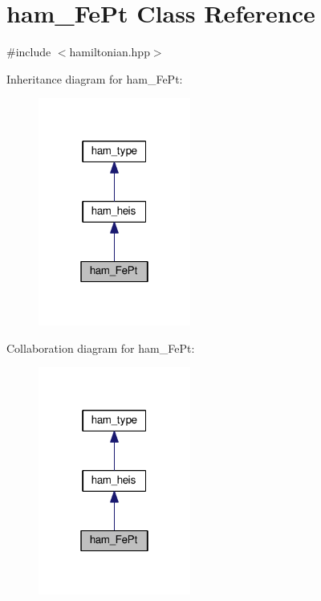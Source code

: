 \hypertarget{classham__FePt}{}\section{ham\+\_\+\+Fe\+Pt Class Reference}
\label{classham__FePt}


{\ttfamily \#include $<$hamiltonian.\+hpp$>$}



Inheritance diagram for ham\+\_\+\+Fe\+Pt\+:
\nopagebreak
\begin{figure}[H]
\begin{center}
\leavevmode
\includegraphics[width=142pt]{da/d70/classham__FePt__inherit__graph}
\end{center}
\end{figure}


Collaboration diagram for ham\+\_\+\+Fe\+Pt\+:
\nopagebreak
\begin{figure}[H]
\begin{center}
\leavevmode
\includegraphics[width=142pt]{d8/d56/classham__FePt__coll__graph}
\end{center}
\end{figure}
